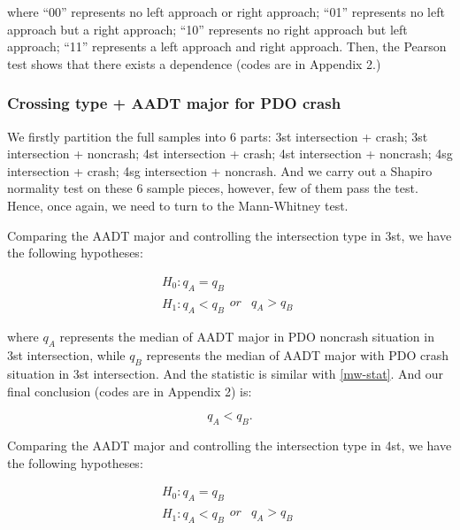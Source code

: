 \documentclass[11pt]{scrartcl} %
\begin{document}
where ``00'' represents no left approach or right approach; ``01'' represents no left approach but a right approach; ``10'' represents no right approach but left approach; ``11'' represents a left approach and right approach. Then, the Pearson test shows that there exists a dependence (codes are in Appendix 2.)

\subsubsection{Crossing type + AADT major for PDO crash}

We firstly partition the full samples into 6 parts: 3st intersection + crash; 3st intersection + noncrash; 4st intersection + crash; 4st intersection + noncrash; 4sg intersection + crash; 4sg intersection + noncrash. And we carry out a Shapiro normality test on these 6 sample pieces, however, few of them pass the test. Hence, once again, we need to turn to the Mann-Whitney test.

\par

Comparing the AADT major and controlling the intersection type in 3st, we have the following hypotheses:

\begin{equation*}
\begin{array}{l}
{H_0}:{q_A} = {q_B}\\
{H_1}:{q_A} < {q_B}\begin{array}{*{20}{c}}
{or}&{{q_A} > {q_B}}
\end{array}
\end{array}
\end{equation*}

where $q_A$ represents the median of AADT major in PDO noncrash situation in 3st intersection, while $q_B$ represents the median of AADT major with PDO crash situation in 3st intersection. And the statistic is similar with \eqref{mw-stat}. And our final conclusion (codes are in Appendix 2) is:

\begin{equation*}
{q_A} < {q_B}.
\end{equation*}

\par

Comparing the AADT major and controlling the intersection type in 4st, we have the following hypotheses:

\begin{equation*}
\begin{array}{l}
{H_0}:{q_A} = {q_B}\\
{H_1}:{q_A} < {q_B}\begin{array}{*{20}{c}}
{or}&{{q_A} > {q_B}}
\end{array}
\end{array}
\end{equation*}
\end{document}

